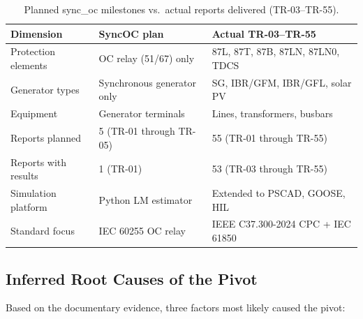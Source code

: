 \documentclass[12pt,a4paper]{article}
\begin{document}
\begin{table}[H]
\centering
\caption{Planned sync\_oc milestones vs.\ actual reports delivered (TR-03--TR-55).}
\label{tab:pivot_scope}
\small
\begin{tabular}{lll}
\toprule
\textbf{Dimension} & \textbf{SyncOC plan} & \textbf{Actual TR-03--TR-55} \\
\midrule
Protection elements & OC relay (51/67) only & 87L, 87T, 87B, 87LN, 87LN0, TDCS \\
Generator types     & Synchronous generator only & SG, IBR/GFM, IBR/GFL, solar PV \\
Equipment           & Generator terminals & Lines, transformers, busbars \\
Reports planned     & 5 (TR-01 through TR-05) & 55 (TR-01 through TR-55) \\
Reports with results & 1 (TR-01) & 53 (TR-03 through TR-55) \\
Simulation platform & Python LM estimator & Extended to PSCAD, GOOSE, HIL \\
Standard focus      & IEC 60255 OC relay & IEEE C37.300-2024 CPC + IEC 61850 \\
\bottomrule
\end{tabular}
\end{table}

\subsection{Inferred Root Causes of the Pivot}
\label{sec:pivot:causes}

Based on the documentary evidence, three factors most likely caused the pivot:
\end{document}
